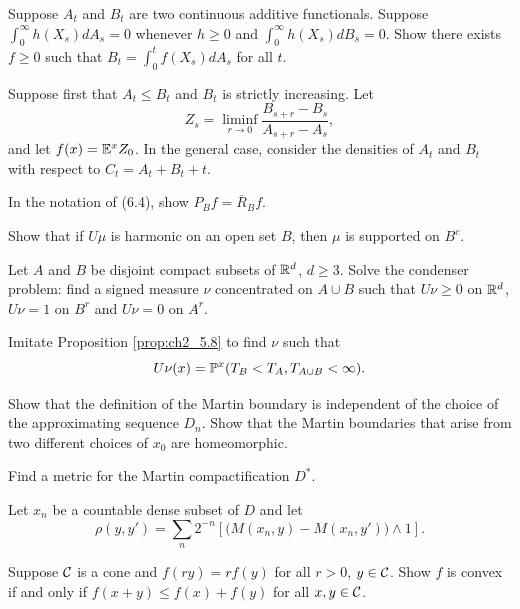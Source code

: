 \begin{exercise}\label{ex:ch2_32}
Suppose $A_t$ and $B_t$ are two continuous additive functionals. Suppose $\int_0^\infty h(X_s)dA_s = 0$ whenever $h \geq 0$ and $\int_0^\infty h(X_s)dB_s = 0$. Show there exists $f \geq 0$ such that $B_t = \int_0^t f(X_s)dA_s$ for all $t$.

\hint Suppose first that $A_t \leq B_t$ and $B_t$ is strictly increasing. Let
\[
    Z_s = \liminf_{r\to 0} \frac{B_{s+r} - B_s}{A_{s+r} - A_s},
\]
and let $f(x) = \E^xZ_0$. In the general case, consider the densities of $A_t$ and $B_t$ with respect to $C_t = A_t + B_t + t$.
\end{exercise}

\begin{exercise}\label{ex:ch2_33}
In the notation of (6.4), show $P_Bf = \overline{R}_Bf$.
\end{exercise}

\begin{exercise}\label{ex:ch2_34}
Show that if $U\mu$ is harmonic on an open set $B$, then $\mu$ is supported on $B^c$.
\end{exercise}

\begin{exercise}\label{ex:ch2_35}
Let $A$ and $B$ be disjoint compact subsets of $\R^d$, $d \geq 3$. Solve the condenser problem: find a signed measure $\nu$ concentrated on $A\cup B$ such that $U\nu \geq 0$ on $\R^d$, $U\nu = 1$ on $B^r$ and $U\nu = 0$ on $A^r$.

\hint Imitate Proposition \ref{prop:ch2_5.8} to find $\nu$ such that
\[
    U\nu(x) = \P^x(T_B < T_A, T_{A\cup B} < \infty).
\]
\end{exercise}

\begin{exercise}\label{ex:ch2_36}
Show that the definition of the Martin boundary is independent of the choice of the approximating sequence $D_n$. Show that the Martin boundaries that arise from two different choices of $x_0$ are homeomorphic.
\end{exercise}

\begin{exercise}\label{ex:ch2_37}
Find a metric for the Martin compactification $D^*$.

\hint Let $x_n$ be a countable dense subset of $D$ and let
\[
    \rho(y,y') = \sum_n 2^{-n}[\big(M(x_n,y) - M(x_n,y')\big) \wedge 1].
\]
\end{exercise}

\begin{exercise}\label{ex:ch2_38}
Suppose $\CC$ is a cone and $f(ry) = rf(y)$ for all $r > 0$, $y \in \CC$. Show $f$ is convex if and only if $f(x + y) \leq f(x) + f(y)$ for all $x,y \in \CC$.
\end{exercise}

